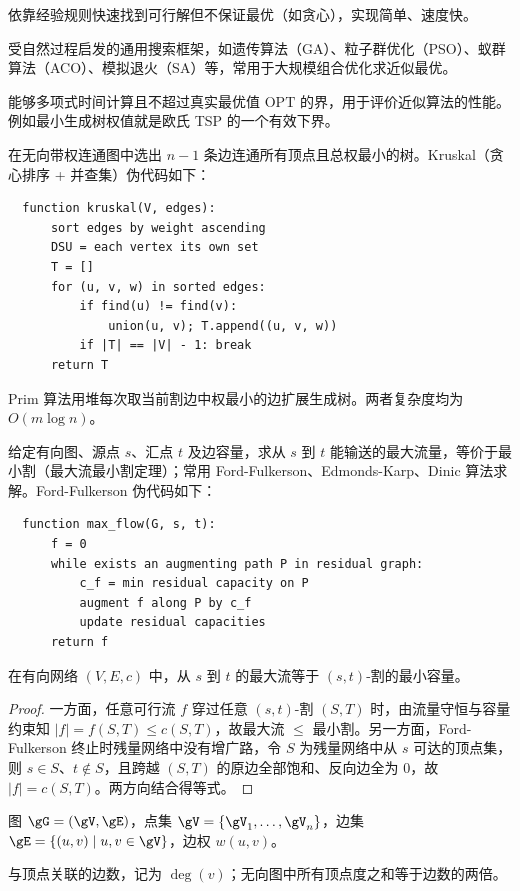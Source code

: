 \documentclass[12pt]{article}
\begin{document}
\begin{defn}
  依靠经验规则快速找到可行解但不保证最优（如贪心），实现简单、速度快。
\end{defn}

\begin{defn}
  受自然过程启发的通用搜索框架，如遗传算法（GA）、粒子群优化（PSO）、蚁群算法（ACO）、模拟退火（SA）等，常用于大规模组合优化求近似最优。
\end{defn}

\begin{defn}[OPT 下界]
  能够多项式时间计算且不超过真实最优值 $\mathrm{OPT}$ 的界，用于评价近似算法的性能。例如最小生成树权值就是欧氏 TSP 的一个有效下界。
\end{defn}

\begin{defn}
  在无向带权连通图中选出 $n-1$ 条边连通所有顶点且总权最小的树。Kruskal（贪心排序 + 并查集）伪代码如下：
  \begin{verbatim}
  function kruskal(V, edges):
      sort edges by weight ascending
      DSU = each vertex its own set
      T = []
      for (u, v, w) in sorted edges:
          if find(u) != find(v):
              union(u, v); T.append((u, v, w))
          if |T| == |V| - 1: break
      return T
  \end{verbatim}
  Prim 算法用堆每次取当前割边中权最小的边扩展生成树。两者复杂度均为 $O(m\log n)$。
\end{defn}

\begin{defn}[最大流问题]
  给定有向图、源点 $s$、汇点 $t$ 及边容量，求从 $s$ 到 $t$ 能输送的最大流量，等价于最小割（最大流最小割定理）；常用 Ford-Fulkerson、Edmonds-Karp、Dinic 算法求解。Ford-Fulkerson 伪代码如下：
  \begin{verbatim}
  function max_flow(G, s, t):
      f = 0
      while exists an augmenting path P in residual graph:
          c_f = min residual capacity on P
          augment f along P by c_f
          update residual capacities
      return f
  \end{verbatim}
\end{defn}
\begin{thm}[最大流最小割定理]
  在有向网络 $(V,E,c)$ 中，从 $s$ 到 $t$ 的最大流等于 $(s,t)$-割的最小容量。
\end{thm}
\begin{proof}
  一方面，任意可行流 $f$ 穿过任意 $(s,t)$-割 $(S,T)$ 时，由流量守恒与容量约束知 $|f| = f(S,T) \le c(S,T)$，故最大流 $\le$ 最小割。另一方面，Ford-Fulkerson 终止时残量网络中没有增广路，令 $S$ 为残量网络中从 $s$ 可达的顶点集，则 $s\in S$、$t\notin S$，且跨越 $(S,T)$ 的原边全部饱和、反向边全为 0，故 $|f|=c(S,T)$。两方向结合得等式。
\end{proof}
\begin{note}
  图 $\gG=(\gV,\gE)$，点集 $\gV=\{\gV_1,\ldots,\gV_n\}$，边集 $\gE=\{(u,v)\mid u,v\in\gV\}$，边权 $w(u,v)$。
\end{note}
\begin{defn}[度（degree）]
  与顶点关联的边数，记为 $\deg(v)$；无向图中所有顶点度之和等于边数的两倍。
\end{defn}
\end{document}
